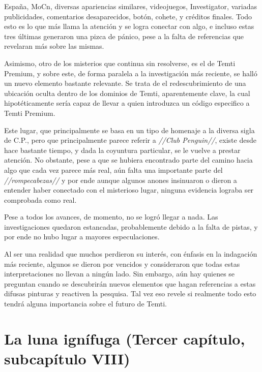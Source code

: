 \documentclass[
  spanish,
]{book}
\begin{document}
España, MoCn, diversas apariencias similares, videojuegos, Investigator, variadas publicidades, comentarios desaparecidos, botón, cohete, y créditos finales. Todo esto es lo que más llama la atención y se logra conectar con algo, e incluso estas tres últimas generaron una pizca de pánico, pese a la falta de referencias que revelaran más sobre las mismas.

Asimismo, otro de los misterios que continua sin resolverse, es el de Temti Premium, y sobre este, de forma paralela a la investigación más reciente, se halló un nuevo elemento bastante relevante. Se trata de el redescubrimiento de una ubicación oculta dentro de los dominios de Temti, aparentemente clave, la cual hipotéticamente sería capaz de llevar a quien introduzca un código especifico a Temti Premium.

Este lugar, que principalmente se basa en un tipo de homenaje a la diversa sigla de C.P., pero que principalmente parece referir a \emph{//Club Penguin//}, existe desde hace bastante tiempo, y dada la coyuntura particular, se le vuelve a prestar atención. No obstante, pese a que se hubiera encontrado parte del camino hacia algo que cada vez parece más real, aún falta una importante parte del \emph{//rompecabezas//} y por ende aunque algunos anones insinuaron o dieron a entender haber conectado con el misterioso lugar, ninguna evidencia lograba ser comprobada como real.

Pese a todos los avances, de momento, no se logró llegar a nada. Las investigaciones quedaron estancadas, probablemente debido a la falta de pistas, y por ende no hubo lugar a mayores especulaciones.

Al ser una realidad que muchos perdieron su interés, con énfasis en la indagación más reciente, algunos se dieron por vencidos y consideraron que todas estas interpretaciones no llevan a ningún lado. Sin embargo, aún hay quienes se preguntan cuando se descubrirán nuevos elementos que hagan referencias a estas difusas pinturas y reactiven la pesquisa. Tal vez eso revele si realmente todo esto tendrá alguna importancia sobre el futuro de Temti.

\hypertarget{la-luna-ignuxedfuga-tercer-capuxedtulo-subcapuxedtulo-viii}{%
\section{La luna ignífuga (Tercer capítulo, subcapítulo VIII)}\label{la-luna-ignuxedfuga-tercer-capuxedtulo-subcapuxedtulo-viii}}
\end{document}
